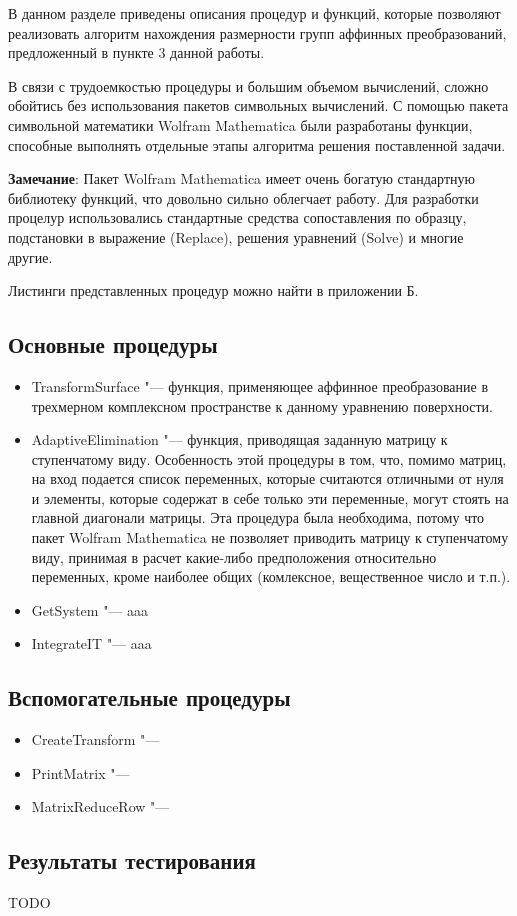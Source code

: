 \documentclass[../main.tex]{subfiles}
\begin{document}
В данном разделе приведены описания процедур и функций, которые позволяют реализовать алгоритм нахождения размерности групп аффинных преобразований, предложенный в пункте 3 данной работы. 

В связи с трудоемкостью процедуры и большим объемом вычислений, сложно обойтись без использования пакетов символьных вычислений. С помощью пакета символьной математики {\ttfamily Wolfram Mathematica} были разработаны функции, способные выполнять отдельные этапы алгоритма решения поставленной задачи.

\textbf{Замечание}: Пакет {\ttfamily Wolfram Mathematica} имеет очень богатую стандартную библиотеку функций, что довольно сильно облегчает работу. Для разработки процелур использовались стандартные средства сопоставления по образцу, подстановки в выражение ({\ttfamily Replace}), решения уравнений ({\ttfamily Solve}) и многие другие.

Листинги представленных процедур можно найти в приложении Б.

\subsection{Основные процедуры}

\begin{itemize}

\item {\ttfamily TransformSurface} "--- функция, применяющее аффинное преобразование в трехмерном комплексном пространстве к данному уравнению поверхности. 

\item {\ttfamily AdaptiveElimination} "--- функция, приводящая заданную матрицу к ступенчатому виду. Особенность этой процедуры в том, что, помимо матриц, на вход подается список переменных, которые считаются отличными от нуля и элементы, которые содержат в себе только эти переменные, могут стоять на главной диагонали матрицы. Эта процедура была необходима, потому что пакет {\ttfamily Wolfram Mathematica} не позволяет приводить матрицу к ступенчатому виду, принимая в расчет какие-либо предположения относительно переменных, кроме наиболее общих (комлексное, вещественное число и т.п.).

\item {\ttfamily GetSystem} "---  aaa

\item {\ttfamily IntegrateIT} "---  aaa

\end{itemize}

\subsection{Вспомогательные процедуры}
\begin{itemize}
\item {\ttfamily CreateTransform} "---

\item {\ttfamily PrintMatrix} "---

\item {\ttfamily MatrixReduceRow} "---

\end{itemize}

\subsection{Результаты тестирования}
TODO
\end{document}
